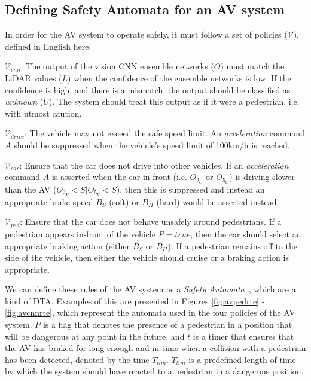 \subsection{Defining Safety Automata for an \ac{AV} system}
In order for the \ac{AV} system to operate safely, it must follow a set of policies ($\mathcal{V}$), defined in English here:

$\mathcal{V}_{cnn}$: The output of the vision \ac{CNN} ensemble networks ($O$) must match the \ac{LiDAR} values ($L$) when the confidence of the ensemble networks is low. 
If the confidence is high, and there is a mismatch, the output should be classified as \textit{unknown} ($U$).
The system should treat this output as if it were a pedestrian, i.e. with utmost caution.

$\mathcal{V}_{drive}$: The vehicle may not exceed the safe speed limit. 
An \textit{acceleration} command $A$ should be suppressed when the vehicle's speed limit of 100km/h is reached.

$\mathcal{V}_{car}$: Ensure that the car does not drive into other vehicles. If an \textit{acceleration} command $A$ is asserted when the car in front (i.e. $O_{2_C}$ or $O_{5_C}$) is driving slower than the \ac{AV} ($O_{2_V}<S|O_{5_V}<S$), then this is suppressed and instead an appropriate brake speed $B_S$ (soft) or $B_H$ (hard) would be asserted instead.

$\mathcal{V}_{ped}$: Ensure that the car does not behave unsafely around pedestrians. If a pedestrian appears in-front of the vehicle $P=true$, then the car should select an appropriate braking action (either $B_S$ or $B_H$). If a pedestrian remains off to the side of the vehicle, then either the vehicle should cruise or a braking action is appropriate.

We can define these rules of the \ac{AV} system as a \textit{Safety Automata}~\cite{recps}, which are a kind of \acf{DTA}. 
Examples of this are presented in Figures \ref{fig:avpedrte} - \ref{fig:avcnnrte}, which represent the automata used in the four policies of the \ac{AV} system.
$P$ is a flag that denotes the presence of a pedestrian in a position that will be dangerous at any point in the future, and $t$ is a timer that ensures that the \ac{AV} has braked for long enough and in time when a collision with a pedestrian has been detected, denoted by the time $T_{lim}$. 
$T_{lim}$ is a predefined length of time by which the system should have reacted to a pedestrian in a dangerous position.


